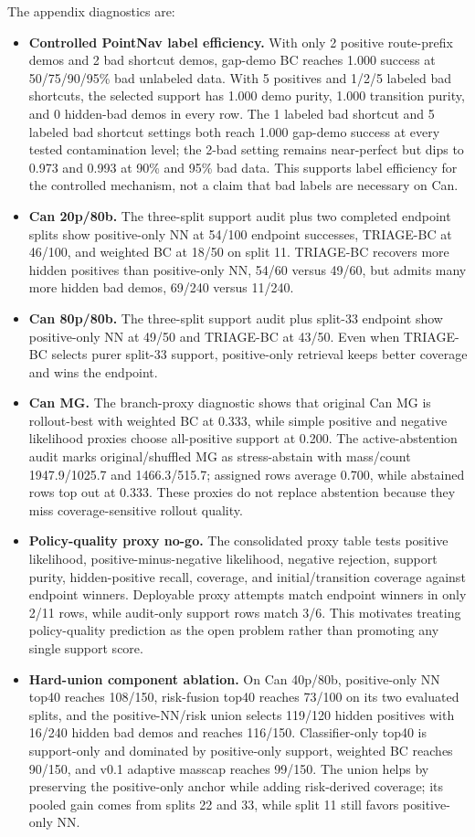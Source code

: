 \documentclass[11pt]{article}
\newcommand{\method}{TRIAGE-BC}
\begin{document}
The appendix diagnostics are:
\begin{itemize}[leftmargin=*]
  \item \textbf{Controlled PointNav label efficiency.} With only 2 positive route-prefix demos and 2 bad shortcut demos, gap-demo BC reaches 1.000 success at 50/75/90/95\% bad unlabeled data. With 5 positives and 1/2/5 labeled bad shortcuts, the selected support has 1.000 demo purity, 1.000 transition purity, and 0 hidden-bad demos in every row. The 1 labeled bad shortcut and 5 labeled bad shortcut settings both reach 1.000 gap-demo success at every tested contamination level; the 2-bad setting remains near-perfect but dips to 0.973 and 0.993 at 90\% and 95\% bad data. This supports label efficiency for the controlled mechanism, not a claim that bad labels are necessary on Can.
  \item \textbf{Can 20p/80b.} The three-split support audit plus two completed endpoint splits show positive-only NN at 54/100 endpoint successes, \method{} at 46/100, and weighted BC at 18/50 on split 11. \method{} recovers more hidden positives than positive-only NN, 54/60 versus 49/60, but admits many more hidden bad demos, 69/240 versus 11/240.
  \item \textbf{Can 80p/80b.} The three-split support audit plus split-33 endpoint show positive-only NN at 49/50 and \method{} at 43/50. Even when \method{} selects purer split-33 support, positive-only retrieval keeps better coverage and wins the endpoint.
  \item \textbf{Can MG.} The branch-proxy diagnostic shows that original Can MG is rollout-best with weighted BC at 0.333, while simple positive and negative likelihood proxies choose all-positive support at 0.200. The active-abstention audit marks original/shuffled MG as stress-abstain with mass/count 1947.9/1025.7 and 1466.3/515.7; assigned rows average 0.700, while abstained rows top out at 0.333. These proxies do not replace abstention because they miss coverage-sensitive rollout quality.
  \item \textbf{Policy-quality proxy no-go.} The consolidated proxy table tests positive likelihood, positive-minus-negative likelihood, negative rejection, support purity, hidden-positive recall, coverage, and initial/transition coverage against endpoint winners. Deployable proxy attempts match endpoint winners in only 2/11 rows, while audit-only support rows match 3/6. This motivates treating policy-quality prediction as the open problem rather than promoting any single support score.
  \item \textbf{Hard-union component ablation.} On Can 40p/80b, positive-only NN top40 reaches 108/150, risk-fusion top40 reaches 73/100 on its two evaluated splits, and the positive-NN/risk union selects 119/120 hidden positives with 16/240 hidden bad demos and reaches 116/150. Classifier-only top40 is support-only and dominated by positive-only support, weighted BC reaches 90/150, and v0.1 adaptive masscap reaches 99/150. The union helps by preserving the positive-only anchor while adding risk-derived coverage; its pooled gain comes from splits 22 and 33, while split 11 still favors positive-only NN.

\end{itemize}
\end{document}
